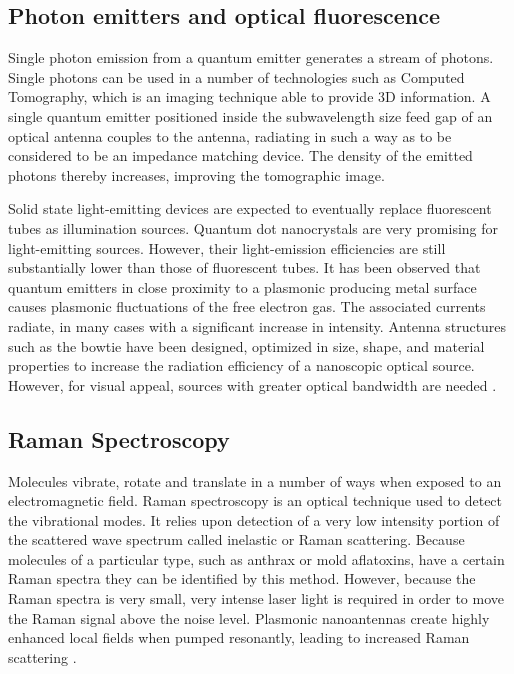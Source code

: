 \documentclass[11pt]{article}
\begin{document}
\subsection{Photon emitters and optical fluorescence}
%
Single photon emission from a quantum emitter generates a stream of photons. Single photons can be used in a number of technologies such as Computed Tomography, which is an imaging technique able to provide 3D information. A single quantum emitter positioned inside the subwavelength size feed gap of an optical antenna couples to the antenna, radiating in such a way as to be considered to be an impedance matching device. The density of the emitted photons thereby increases, improving the tomographic image.

Solid state light-emitting devices are expected to eventually replace fluorescent tubes as illumination sources. Quantum dot nanocrystals are very promising for light-emitting sources. However, their light-emission efficiencies are still substantially lower than those of fluorescent tubes. It has been observed that quantum emitters in close proximity to a plasmonic producing metal surface causes plasmonic fluctuations of the free electron gas. The associated currents radiate, in many cases with a significant increase in intensity. Antenna structures such as the bowtie have been designed, optimized in size, shape, and material properties to increase the radiation efficiency of a nanoscopic optical source. However, for visual appeal, sources with greater optical bandwidth are needed \cite{farahani,Curto2010}.
\subsection{Raman Spectroscopy}
%
Molecules vibrate, rotate and translate in a number of ways when exposed to an electromagnetic field. Raman spectroscopy is an optical technique used to detect the vibrational modes. It relies upon detection of a very low intensity portion of the scattered wave spectrum called inelastic or Raman scattering. Because molecules of a particular type, such as anthrax or mold aflatoxins, have a certain Raman spectra they can be identified by this method. However, because the Raman spectra is very small, very intense laser light is required in order to move the Raman signal above the noise level. Plasmonic nanoantennas create highly enhanced local fields when pumped resonantly, leading to increased Raman scattering \cite{Felidj2003}.
\end{document}
